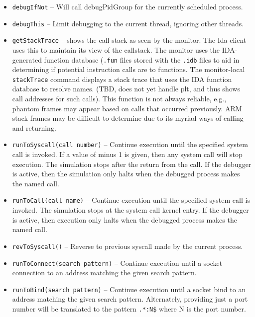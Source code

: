 \documentclass[titlepage]{article}
\begin{document}
\begin{itemize}
\item {\tt debugIfNot} -- Will call debugPidGroup for the currently scheduled process.

\item {\tt debugThis} -- Limit debugging to the current thread, ignoring other threads.

\item {\tt getStackTrace} – shows the call stack as seen by the monitor.  The Ida client uses this to maintain its view of the callstack.  The monitor
uses the IDA-generated function database ({\tt .fun} files stored with the {\tt .idb} files to aid in determining if 
potential instruction calls are to functions.  The monitor-local {\tt stackTrace} command displays a
stack trace that uses the IDA function database to resolve names.  (TBD, does not yet handle plt, and thus shows call addresses for such calls).
This function is not always reliable, e.g., phantom frames may appear based on calls that occurred previously. ARM stack frames may be
difficult to determine due to its myriad ways of calling and returning. 

\item {\tt runToSyscall(call number)} – Continue execution until the specified system call is invoked.  If a value of minus 1 is given, then any system call will stop execution.  The simulation stops after the return from the call.  If the debugger is active, then the simulation only halts when the debugged process makes the named call.

\item {\tt runToCall(call name)} – Continue execution until the specified system call is invoked.  The simulation stops at the system call kernel entry.
If the debugger is active, then execution only halts when the debugged process makes the named call.

\item {\tt revToSyscall()} -- Reverse to previous syscall made by the current process.

\item {\tt runToConnect(search pattern)} – Continue execution until a socket connection to an address matching the given search pattern.

\item {\tt runToBind(search pattern)} – Continue execution until a socket bind to an address matching the given search pattern.  Alternately, providing just
a port number will be translated to the pattern {\tt .*:N\$} where N is the port number.


\end{itemize}
\end{document}
